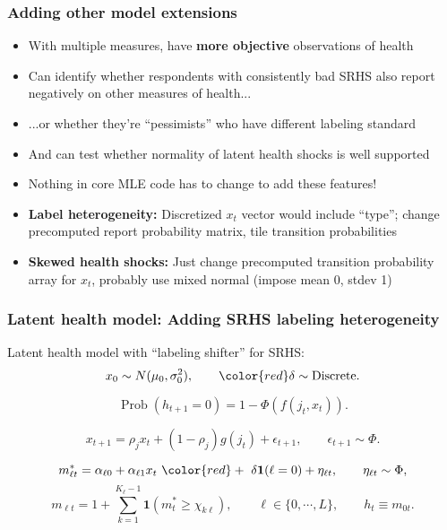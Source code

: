 \documentclass[aspectratio=169]{beamer}
\newcommand{\Prob}{\operatorname{Prob}}
\begin{document}
\begin{frame}\frametitle{Adding other model extensions}
\begin{itemize}
\item <1->With multiple measures, have \textbf{more objective} observations of health

\item <1->Can identify whether respondents with consistently bad SRHS also report negatively on other measures of health...

\item <2->...or whether they're ``pessimists'' who have different labeling standard

\item <3->And can test whether normality of latent health shocks is well supported

\item <4->Nothing in core MLE code has to change to add these features!

\item <4->\textbf{Label heterogeneity:} Discretized $x_t$ vector would include ``type''; change precomputed report probability matrix, tile transition probabilities

\item <4->\textbf{Skewed health shocks:} Just change precomputed transition probability array for $x_t$, probably use mixed normal (impose mean 0, stdev 1)
\end{itemize}
\end{frame}


\begin{frame}\frametitle{Latent health model: Adding SRHS labeling heterogeneity}
Latent health model with ``labeling shifter'' for SRHS:
\setcounter{equation}{0}
\begin{equation}
x_0 \sim N(\mu_0, \sigma^2_0), \qquad {\color{red} \delta \sim \text{Discrete}}.
\end{equation}

\begin{equation}
\Prob(h_{t+1} = 0) = 1 - \Phi(f(j_t,x_t)).
\end{equation}

\begin{equation}
x_{t+1} = \rho_{j} x_t + (1-\rho_j)g(j_t) + \epsilon_{t+1}, \qquad \epsilon_{t+1} \sim \Phi.
\end{equation}

\begin{equation}
m^*_{\ell t} = \alpha_{\ell 0} + \alpha_{\ell 1} x_t ~ {\color{red} + ~ \delta \mathbf{1}(\ell=0)} + \eta_{\ell t}, \qquad \eta_{\ell t} \sim \Phi,
\end{equation}
\begin{equation*}
m_{\ell t} = 1 + \sum_{k = 1}^{K_{\ell}-1} \mathbf{1}(m^*_t \geq \chi_{k\ell}), \qquad \ell \in \{0,\cdots,L\}, \qquad h_t \equiv m_{0t}.
\end{equation*}
\end{frame}
\end{document}

